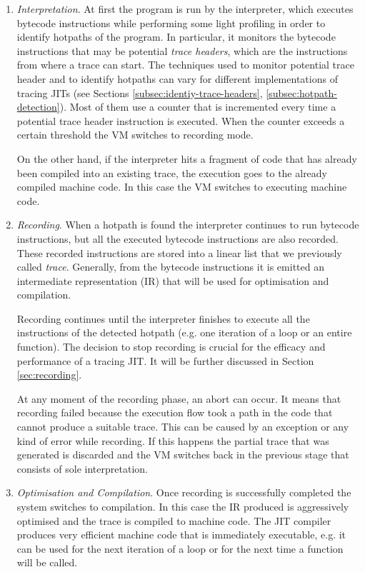 \begin{enumerate}
    
    \item \textit{Interpretation}. At first the program is run by the interpreter, which executes bytecode instructions while performing some light profiling in order to identify hotpaths of the program. In particular, it monitors the bytecode instructions that may be potential \textit{trace headers}, which are the instructions from where a trace can start. The techniques used to monitor potential trace header and to identify hotpaths can vary for different implementations of tracing JITs (see Sections \ref{subsec:identiy-trace-headers}, \ref{subsec:hotpath-detection}). Most of them use a counter that is incremented every time a potential trace header instruction is executed. When the counter exceeds a certain threshold the VM switches to recording mode. 
    
    On the other hand, if the interpreter hits a fragment of code that has already been compiled into an existing trace, the execution goes to the already compiled machine code. In this case the VM switches to executing machine code. 
    
    \item \textit{Recording}. When a hotpath is found the interpreter continues to run bytecode instructions, but all the executed bytecode instructions are also recorded. These recorded instructions are stored into a linear list that we previously called \textit{trace}. Generally, from the bytecode instructions it is emitted an intermediate representation (IR) that will be used for optimisation and compilation.
    
    Recording continues until the interpreter finishes to execute all the instructions of the detected hotpath (e.g. one iteration of a loop or an entire function). The decision to stop recording is crucial for the efficacy and performance of a tracing JIT. It will be further discussed in Section \ref{sec:recording}.
    
    At any moment of the recording phase, an abort can occur. It means that recording failed because the execution flow took a path in the code that cannot produce a suitable trace. This can be caused by an exception or any kind of error while recording. If this happens the partial trace that was generated is discarded and the VM switches back in the previous stage that consists of sole interpretation. 
    
    
    \item \textit{Optimisation and Compilation}. Once recording is successfully completed the system switches to compilation. In this case the IR produced is aggressively optimised and the trace is compiled to machine code. The JIT compiler produces very efficient machine code that is immediately executable, e.g. it can be used for the next iteration of a loop or for the next time a function will be called.
    

\end{enumerate}
